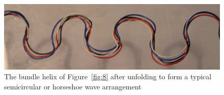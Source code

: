 %

\begin{figure}[!h]
  \centering
  \includegraphics[width=1.1\textwidth]{fig10.jpg}
  \caption{The bundle helix of Figure~\ref{fig:8} after unfolding to form a typical semicircular or horseshoe wave arrangement}
  \label{fig:10}
\end{figure}

%

